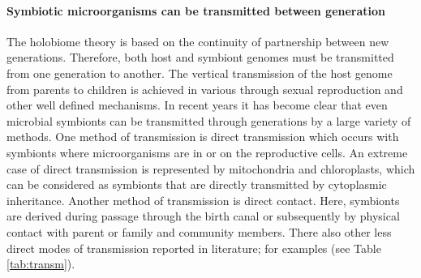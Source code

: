 \paragraph{Symbiotic microorganisms can be transmitted between generation}
The holobiome theory is based on the continuity of partnership between new generations. Therefore, both host and symbiont genomes must be transmitted from one generation to another. The vertical transmission of the host genome from parents to children is achieved in various through sexual reproduction and other well defined mechanisms. In recent years it has become clear that even microbial symbionts can be transmitted through generations by a large variety  of methods. One method of transmission is direct transmission which occurs with symbionts where microorganisms are in or on the reproductive cells. An extreme case of direct transmission is represented by mitochondria and chloroplasts, which can be considered as symbionts that are directly transmitted by cytoplasmic inheritance. Another method of transmission is direct contact. Here, symbionts are derived during passage through the birth canal or subsequently by physical contact with parent or family and community members. There also other less direct modes of transmission reported in literature; for examples (see Table \ref{tab:transm}).
